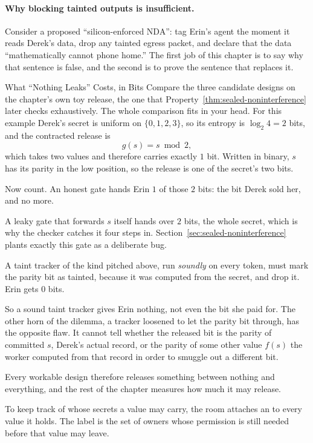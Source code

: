 \documentclass[11pt,a4paper]{article}
\theoremstyle{definition}
\begin{document}
\paragraph{Why blocking tainted outputs is insufficient.}
Consider a proposed ``silicon-enforced NDA'': tag Erin's agent the moment it
reads Derek's data, drop any tainted egress packet, and declare that the data
``mathematically cannot phone home.'' The first job of this chapter is to say
why that sentence is false, and the second is to prove the sentence that
replaces it.
\begin{pdexample}{What ``Nothing Leaks'' Costs, in Bits}
\setlength{\parskip}{4pt plus 1pt}
Compare the three candidate designs on the chapter's own toy release, the one
that Property~\ref{thm:sealed-noninterference} later checks exhaustively. The
whole comparison fits in your head. For this example Derek's secret is uniform on
$\{0,1,2,3\}$, so its entropy is $\log_2 4 = 2$ bits, and the contracted release is
\[
g(s)=s\bmod 2,
\]
which takes two values and therefore carries exactly $1$ bit. Written in
binary, $s$ has its parity in the low position, so the release is one of the
secret's two bits.

Now count. An honest gate
hands Erin $1$ of those $2$ bits: the bit Derek sold her, and no more.

A leaky gate that forwards $s$ itself hands over $2$ bits, the whole secret,
which is why the checker catches it four steps in.
Section~\ref{sec:sealed-noninterference} plants exactly this gate as a
deliberate bug.

A taint tracker of the kind pitched above, run \emph{soundly} on every token,
must mark the parity bit as tainted, because it was computed from the secret,
and drop it. Erin gets $0$ bits.

So a sound taint tracker gives Erin nothing, not even the bit she paid for. The
other horn of the dilemma, a tracker loosened to let the parity bit through,
has the opposite flaw. It
cannot tell whether the released bit is the parity of committed $s$, Derek's
actual record, or the parity of some other value $f(s)$ the worker computed
from that record in order to smuggle out a different bit.

Every workable design therefore releases something between nothing and
everything, and the rest of the chapter measures how much it may release.
\end{pdexample}

To keep track of whose secrets a value may carry, the room attaches an
 to every value it holds. The label is the set of owners
whose permission is still needed before that value may leave.
\end{document}
